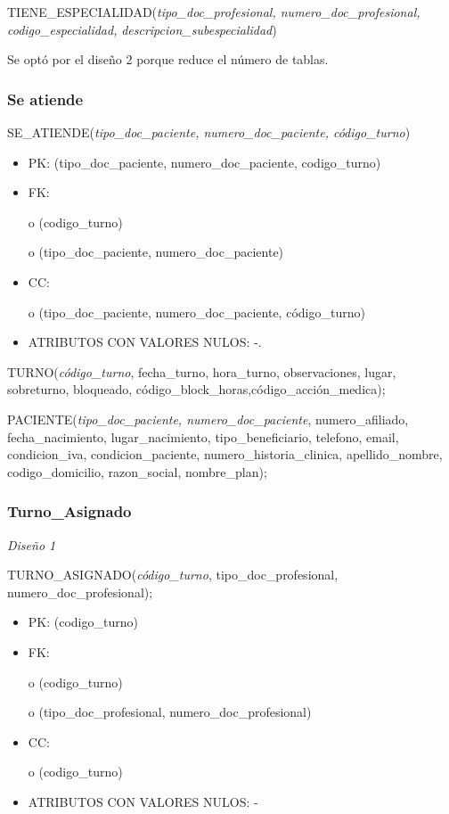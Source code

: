 \documentclass[a4paper,11pt]{article}
\begin{document}
TIENE\_ESPECIALIDAD(\emph{tipo\_doc\_profesional, numero\_doc\_profesional, codigo\_especialidad,} 
\emph{descripcion\_subespecialidad})

Se optó por el diseño 2 porque reduce el número de tablas.\label{HToc293405853}

\subsubsection{\textbf{Se atiende}}

SE\_ATIENDE(\emph{tipo\_doc\_paciente, numero\_doc\_paciente, código\_turno})

\begin{itemize}
\item PK: (tipo\_doc\_paciente, numero\_doc\_paciente, codigo\_turno)

\item FK: 

o (codigo\_turno)

o (tipo\_doc\_paciente, numero\_doc\_paciente)

\item CC:

o (tipo\_doc\_paciente, numero\_doc\_paciente, código\_turno)

\item ATRIBUTOS CON VALORES NULOS:  -.
\end{itemize}

TURNO(\emph{código\_turno}, fecha\_turno, hora\_turno, observaciones, lugar, sobreturno, 
bloqueado, código\_block\_horas,código\_acción\_medica);

PACIENTE(\emph{tipo\_doc\_paciente, numero\_doc\_paciente}, numero\_afiliado, fecha\_nacimiento, 
lugar\_nacimiento, tipo\_beneficiario, telefono, email, condicion\_iva, condicion\_paciente, 
numero\_historia\_clinica, apellido\_nombre, codigo\_domicilio, razon\_social, 
 nombre\_plan);\label{HToc293405854}

\subsubsection{\textbf{Turno\_Asignado}}

\textit{Diseño 1}

TURNO\_ASIGNADO(\emph{código\_turno}, tipo\_doc\_profesional, numero\_doc\_profesional);

\begin{itemize}
\item PK: (codigo\_turno)

\item FK: 

o (codigo\_turno)

o (tipo\_doc\_profesional, numero\_doc\_profesional)

\item CC:

o (codigo\_turno)

\item ATRIBUTOS CON VALORES NULOS: -
\end{itemize}
\end{document}
